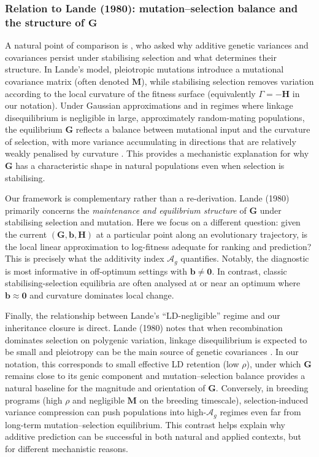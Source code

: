 \documentclass[9pt,twocolumn,twoside,lineno]{gsajnl}
\newcommand{\vect}[1]{\boldsymbol{#1}}
\newcommand{\mat}[1]{\mathbf{#1}}
\newcommand{\Ag}{\ensuremath{\mathcal{A}_{g}}\xspace}
\begin{document}
\subsubsection*{Relation to Lande (1980): mutation--selection balance and the structure of $\mat{G}$}

A natural point of comparison is \citet{Lande1980}, who asked why additive genetic variances and covariances persist under stabilising selection and what determines their structure. In Lande's model, pleiotropic mutations introduce a mutational covariance matrix (often denoted $\mat{M}$), while stabilising selection removes variation according to the local curvature of the fitness surface (equivalently $\Gamma=-\mat{H}$ in our notation). Under Gaussian approximations and in regimes where linkage disequilibrium is negligible in large, approximately random-mating populations, the equilibrium $\mat{G}$ reflects a balance between mutational input and the curvature of selection, with more variance accumulating in directions that are relatively weakly penalised by curvature \citep{Lande1980}. This provides a mechanistic explanation for why $\mat{G}$ has a characteristic shape in natural populations even when selection is stabilising.

Our framework is complementary rather than a re-derivation. Lande (1980) primarily concerns the \emph{maintenance and equilibrium structure} of $\mat{G}$ under stabilising selection and mutation. Here we focus on a different question: given the current $(\mat{G},\vect{b},\mat{H})$ at a particular point along an evolutionary trajectory, is the local linear approximation to log-fitness adequate for ranking and prediction? This is precisely what the additivity index $\Ag$ quantifies. Notably, the diagnostic is most informative in off-optimum settings with $\vect{b}\neq\vect{0}$. In contrast, classic stabilising-selection equilibria are often analysed at or near an optimum where $\vect{b}\approx\vect{0}$ and curvature dominates local change.

Finally, the relationship between Lande's ``LD-negligible'' regime and our inheritance closure is direct. Lande (1980) notes that when recombination dominates selection on polygenic variation, linkage disequilibrium is expected to be small and pleiotropy can be the main source of genetic covariances \citep{Lande1980}. In our notation, this corresponds to small effective LD retention (low $\rho$), under which $\mat{G}$ remains close to its genic component and mutation--selection balance provides a natural baseline for the magnitude and orientation of $\mat{G}$. Conversely, in breeding programs (high $\rho$ and negligible $\mat{M}$ on the breeding timescale), selection-induced variance compression can push populations into high-$\Ag$ regimes even far from long-term mutation--selection equilibrium. This contrast helps explain why additive prediction can be successful in both natural and applied contexts, but for different mechanistic reasons.
\end{document}

